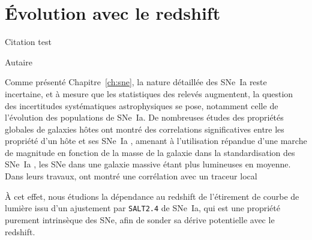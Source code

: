\documentclass[../main/main.tex]{subfiles}
\begin{document}
\raggedbottom

\chapter{\'Evolution avec le redshift}\label{ch:stretch}

\epigraph{\openquote Citation test\closequote}{Autaire}

Comme présenté Chapitre~\ref{ch:sne}, la nature détaillée des SNe~Ia reste
incertaine, et à mesure que les statistiques des relevés augmentent, la question
des incertitudes systématiques astrophysiques se pose, notamment celle de
l'évolution des populations de SNe~Ia. De nombreuses études des propriétés
globales de galaxies hôtes ont montré des correlations significatives entre les
propriété d'un hôte et ses SNe~Ia \citep{kelly2010, hayden2013, roman2018},
amenant à l'utilisation répandue d'une marche de magnitude en fonction de la
masse de la galaxie dans la standardisation des SNe~Ia \citep{scolnic2018,
smith2020, popovic2021a}, les SNe dans une galaxie massive étant plus lumineuses
en moyenne. Dans leurs travaux, \cite{rigault2020} ont montré une
corrélation avec un traceur local

À cet effet, nous étudions la dépendance au redshift de l'étirement de courbe de
lumière issu d'un ajustement par \texttt{SALT2.4} de SNe~Ia, qui est une
propriété purement intrinsèque des SNe, afin de sonder sa dérive potentielle
avec le redshift.
\end{document}
